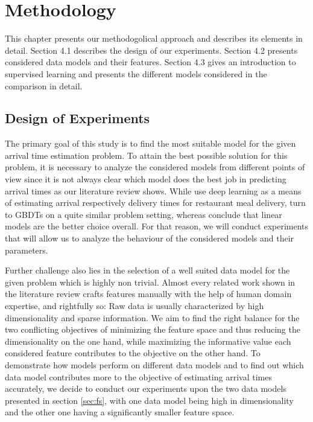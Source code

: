 \chapter{Methodology}\label{chap:method}
This chapter presents our methodogolical approach and describes its elements in detail. 
Section 4.1 describes the design of our experiments. 
Section 4.2 presents considered data models and their features.
Section 4.3 gives an introduction to supervised learning and presents the different models considered in the comparison in detail.

\section{Design of Experiments}\label{sec:design}

The primary goal of this study is to find the most suitable model for the given arrival time estimation problem. 
To attain the best possible solution for this problem, it is necessary to analyze the considered models from different points of view since it is not always clear which model does the best job in predicting arrival times as our literature review shows. 
While \cite{Zhu2020_OFCTE_DL} use deep learning as a means of estimating arrival respectively delivery times for restaurant meal delivery, \cite{Hildebrandt2020_EAT} turn to GBDTs on a quite similar problem setting, whereas \cite{Liu2018_LM_PLM} conclude that linear models are the better choice overall.
For that reason, we will conduct experiments that will allow us to analyze the behaviour of the considered models and their parameters. 

Further challenge also lies in the selection of a well suited data model for the given problem which is highly non trivial. 
Almost every related work shown in the literature review crafts features manually with the help of human domain expertise, and rightfully so: Raw data is usually characterized by high dimensionality and sparse information. We aim to find the right balance for the two conflicting objectives of minimizing the feature space and thus reducing the dimensionality on the one hand, while maximizing the informative value each considered feature contributes to the objective on the other hand. 
To demonstrate how models perform on different data models and to find out which data model contributes more to the objective of estimating arrival times accurately, we decide to conduct our experiments upon the two data models presented in section \ref{sec:fs}, with one data model being high in dimensionality and the other one having a significantly smaller feature space.

